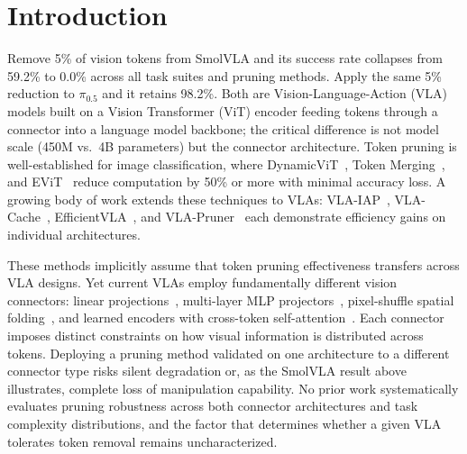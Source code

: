 \section{Introduction}
\label{sec:introduction}

Remove 5\% of vision tokens from SmolVLA and its success rate collapses from 59.2\% to 0.0\% across all task suites and pruning methods. Apply the same 5\% reduction to $\pi_0.5$ and it retains 98.2\%. Both are Vision-Language-Action (VLA) models built on a Vision Transformer (ViT) encoder feeding tokens through a connector into a language model backbone; the critical difference is not model scale (450M vs.\ 4B parameters) but the connector architecture. Token pruning is well-established for image classification, where DynamicViT~\cite{rao2021dynamicvit}, Token Merging~\cite{bolya2023tome}, and EViT~\cite{liang2022evit} reduce computation by 50\% or more with minimal accuracy loss. A growing body of work extends these techniques to VLAs: VLA-IAP~\cite{wang2026vlaiap}, VLA-Cache~\cite{hsu2025vlacache}, EfficientVLA~\cite{yang2025efficientvla}, and VLA-Pruner~\cite{liu2025vlapruner} each demonstrate efficiency gains on individual architectures.

These methods implicitly assume that token pruning effectiveness transfers across VLA designs. Yet current VLAs employ fundamentally different vision connectors: linear projections~\cite{black2024pi0}, multi-layer MLP projectors~\cite{kim2024openvla}, pixel-shuffle spatial folding~\cite{shukor2025smolvla}, and learned encoders with cross-token self-attention~\cite{zheng2025xvla}. Each connector imposes distinct constraints on how visual information is distributed across tokens. Deploying a pruning method validated on one architecture to a different connector type risks silent degradation or, as the SmolVLA result above illustrates, complete loss of manipulation capability. No prior work systematically evaluates pruning robustness across both connector architectures and task complexity distributions, and the factor that determines whether a given VLA tolerates token removal remains uncharacterized.

